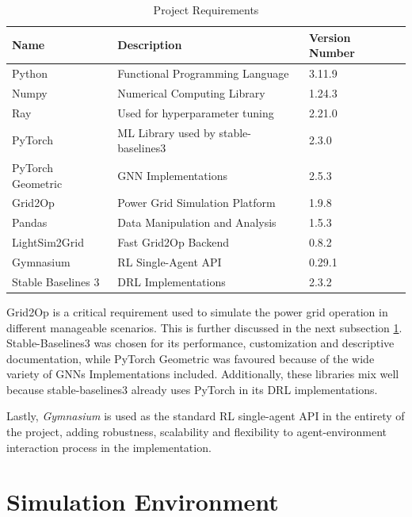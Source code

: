\begin{table}
	\begin{tabular}{|l|l|l|}
		\hline
		\textbf{Name} & \textbf{Description} & \textbf{Version Number} \\
		\hline
		Python & Functional Programming Language & 3.11.9 \\
		\hline
		Numpy & Numerical Computing Library& 1.24.3 \\
		\hline
		Ray & Used for hyperparameter tuning & 2.21.0 \\
		\hline
		PyTorch & \acs{ML} Library used by stable-baselines3 & 2.3.0 \\
		\hline
		PyTorch Geometric & \ac{GNN} Implementations & 2.5.3 \\
		\hline
		Grid2Op & Power Grid Simulation Platform & 1.9.8 \\
		\hline
		Pandas & Data Manipulation and Analysis & 1.5.3 \\
		\hline
		LightSim2Grid & Fast Grid2Op Backend & 0.8.2 \\
		\hline
		Gymnasium & \ac{RL} Single-Agent API & 0.29.1 \\
		\hline
		Stable Baselines 3 & \ac{DRL} Implementations & 2.3.2 \\
		\hline
	\end{tabular}
	\caption{Project Requirements}
\end{table}

Grid2Op is a critical requirement used to simulate the power grid operation in different manageable scenarios. This is further discussed in the next subsection \ref{sec:simulation-env}. Stable-Baselines3 was chosen for its performance, customization and descriptive documentation, while PyTorch Geometric was favoured because of the wide variety of \acp{GNN} Implementations included. Additionally, these libraries mix well because stable-baselines3 already uses PyTorch in its \ac{DRL} implementations.
\par
Lastly, \textit{Gymnasium} is used as the standard \ac{RL} single-agent API in the entirety of the project, adding robustness, scalability and flexibility to agent-environment interaction process in the implementation.  \par

\section{Simulation Environment} \label{sec:simulation-env}

